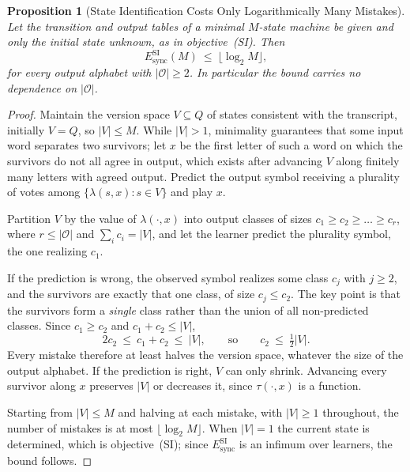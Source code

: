 \documentclass[12pt]{article}
\newtheorem{proposition}[theorem]{Proposition}
\theoremstyle{definition}
\newcommand{\EsyncSI}{E_{\mathrm{sync}}^{\mathrm{SI}}}
\begin{document}
\begin{proposition}[State Identification Costs Only Logarithmically Many Mistakes]
\label{prop:esyncsi-log}
Let the transition and output tables of a \emph{minimal} $M$-state machine be
given and only the initial state unknown, as in objective~(SI).  Then
\[
\EsyncSI(M)\ \le\ \bigl\lfloor\log_2M\bigr\rfloor ,
\]
for \emph{every} output alphabet with $|\mathcal O|\ge2$.  In particular the
bound carries no dependence on $|\mathcal O|$.
\end{proposition}

\begin{proof}
Maintain the version space $V\subseteq Q$ of states consistent with the
transcript, initially $V=Q$, so $|V|\le M$.  While $|V|>1$, minimality
guarantees that some input word separates two survivors; let $x$ be the first
letter of such a word on which the survivors do not all agree in output, which
exists after advancing $V$ along finitely many letters with agreed output.
Predict the output symbol receiving a plurality of votes among $\{\lambda(s,x):
s\in V\}$ and play $x$.

Partition $V$ by the value of $\lambda(\cdot,x)$ into output classes of sizes
$c_1\ge c_2\ge\dots\ge c_r$, where $r\le|\mathcal O|$ and $\sum_ic_i=|V|$, and
let the learner predict the plurality symbol, the one realizing $c_1$.

If the prediction is wrong, the observed symbol realizes some class $c_j$ with
$j\ge2$, and the survivors are exactly that one class, of size
$c_j\le c_2$.  The key point is that the survivors form a \emph{single} class
rather than the union of all non-predicted classes.  Since $c_1\ge c_2$ and
$c_1+c_2\le|V|$,
\[
2c_2\ \le\ c_1+c_2\ \le\ |V|,
\qquad\text{so}\qquad
c_2\ \le\ \tfrac12|V| .
\]
Every mistake therefore at least halves the version space, whatever the size of
the output alphabet.  If the prediction is right, $V$ can only shrink.
Advancing every survivor along $x$ preserves $|V|$ or decreases it, since
$\tau(\cdot,x)$ is a function.

Starting from $|V|\le M$ and halving at each mistake, with $|V|\ge1$
throughout, the number of mistakes is at most $\lfloor\log_2M\rfloor$.  When
$|V|=1$ the current state is determined, which is objective~(SI); since
$\EsyncSI$ is an infimum over learners, the bound follows.
\end{proof}
\end{document}
